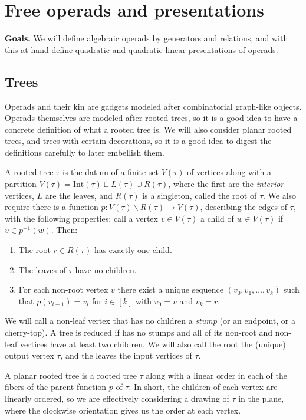 \documentclass[fleqn, a4paper, twoside]{article}
\newcommand{\0}{\langle 0\rangle}
\newenvironment{tenumerate}{
 \begin{enumerate}
  \setlength{\itemsep}{0pt}
  \setlength{\parskip}{0pt}
}{\end{enumerate}}
\DeclareRobustCommand{\[}{\begin{equation}}%
\DeclareRobustCommand{\]}{\end{equation}}%
\theoremstyle{mytheorem}
\theoremstyle{introthm}
\theoremstyle{mydefinition}
\theoremstyle{mydefinition2}
\theoremstyle{plain} %
\newcommand{\?}{\,?\,}
\theoremstyle{mytheorem}
\theoremstyle{plain} %
\newcommand\blankpage{%
    \null
    \thispagestyle{empty}%
    \newpage}
\begin{document}
\afterpage{\blankpage}
\newpage
\section{Free operads and presentations}

\textbf{Goals.} We will define algebraic operads
by generators and relations, and with this at
hand define quadratic and quadratic-linear
presentations of operads. 

\subsection{Trees}

Operads and their kin are gadgets modeled after
combinatorial graph-like objects. Operads themselves are modeled after
rooted trees, so it is a good idea to have a concrete definition of 
what a rooted tree is. We will also consider planar rooted trees,
and trees with certain decorations, so it is a good idea to digest
the definitions carefully to later embellish them.

A rooted tree $\tau$ is the datum of a finite set $V(\tau)$
of vertices along with a partition $V(\tau) = 
\mathrm{Int}(\tau)\sqcup L(\tau) \cup R(\tau)$,
where the first are the \emph{interior} vertices, $L$ are the leaves, and $R(\tau)$ is
a singleton, called the root of $\tau$. We also require there is 
a function $p :V(\tau)\smallsetminus R(\tau) \longrightarrow V(\tau)$,
describing the edges of $\tau$, 
with the following properties: call a vertex $v\in V(\tau)$ a child 
of $w\in V(\tau)$ if $v\in p^{-1}(w)$. Then:
\begin{tenumerate}
\item The root $r\in R(\tau)$ has exactly one child.
\item The leaves of $\tau$ have no children.
\item For each non-root vertex $v$ there exist a unique sequence
$(v_0,v_1,\ldots,v_k)$ such that $p(v_{i-1}) = v_{i}$ for $i\in [k]$
with $v_0 = v$ and $v_k = r$.
\end{tenumerate}
We will call a non-leaf vertex that has no children a \emph{stump}
(or an endpoint, or a cherry-top).
A tree is reduced if has no stumps and all of its non-root and
non-leaf vertices have at least two children. We will also call
the root the (unique) output vertex $\tau$, and the leaves
the input vertices of $\tau$. 

A planar rooted tree is a rooted tree $\tau$
along with a linear order in each of the fibers
of the parent function $p$ of $\tau$. In short,
the children of each vertex are linearly ordered,
so we are effectively considering a drawing of
$\tau$ in the plane, where the clockwise
orientation gives us the order at each
vertex. 
\end{document}
